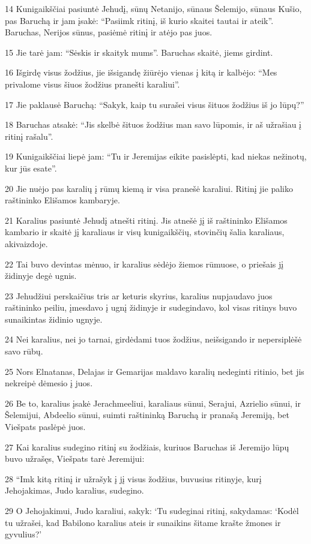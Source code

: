 \par 14 Kunigaikščiai pasiuntė Jehudį, sūnų Netanijo, sūnaus Šelemijo, sūnaus Kušio, pas Baruchą ir jam įsakė: “Pasiimk ritinį, iš kurio skaitei tautai ir ateik”. Baruchas, Nerijos sūnus, pasiėmė ritinį ir atėjo pas juos. 
\par 15 Jie tarė jam: “Sėskis ir skaityk mums”. Baruchas skaitė, jiems girdint. 
\par 16 Išgirdę visus žodžius, jie išsigandę žiūrėjo vienas į kitą ir kalbėjo: “Mes privalome visus šiuos žodžius pranešti karaliui”. 
\par 17 Jie paklausė Baruchą: “Sakyk, kaip tu surašei visus šituos žodžius iš jo lūpų?” 
\par 18 Baruchas atsakė: “Jis skelbė šituos žodžius man savo lūpomis, ir aš užrašiau į ritinį rašalu”. 
\par 19 Kunigaikščiai liepė jam: “Tu ir Jeremijas eikite pasislėpti, kad niekas nežinotų, kur jūs esate”. 
\par 20 Jie nuėjo pas karalių į rūmų kiemą ir visa pranešė karaliui. Ritinį jie paliko raštininko Elišamos kambaryje. 
\par 21 Karalius pasiuntė Jehudį atnešti ritinį. Jis atnešė jį iš raštininko Elišamos kambario ir skaitė jį karaliaus ir visų kunigaikščių, stovinčių šalia karaliaus, akivaizdoje. 
\par 22 Tai buvo devintas mėnuo, ir karalius sėdėjo žiemos rūmuose, o priešais jį židinyje degė ugnis. 
\par 23 Jehudžiui perskaičius tris ar keturis skyrius, karalius nupjaudavo juos raštininko peiliu, įmesdavo į ugnį židinyje ir sudegindavo, kol visas ritinys buvo sunaikintas židinio ugnyje. 
\par 24 Nei karalius, nei jo tarnai, girdėdami tuos žodžius, neišsigando ir nepersiplėšė savo rūbų. 
\par 25 Nors Elnatanas, Delajas ir Gemarijas maldavo karalių nedeginti ritinio, bet jis nekreipė dėmesio į juos. 
\par 26 Be to, karalius įsakė Jerachmeeliui, karaliaus sūnui, Serajui, Azrielio sūnui, ir Šelemijui, Abdeelio sūnui, suimti raštininką Baruchą ir pranašą Jeremiją, bet Viešpats paslėpė juos. 
\par 27 Kai karalius sudegino ritinį su žodžiais, kuriuos Baruchas iš Jeremijo lūpų buvo užrašęs, Viešpats tarė Jeremijui: 
\par 28 “Imk kitą ritinį ir užrašyk į jį visus žodžius, buvusius ritinyje, kurį Jehojakimas, Judo karalius, sudegino. 
\par 29 O Jehojakimui, Judo karaliui, sakyk: ‘Tu sudeginai ritinį, sakydamas: ‘Kodėl tu užrašei, kad Babilono karalius ateis ir sunaikins šitame krašte žmones ir gyvulius?’ 
